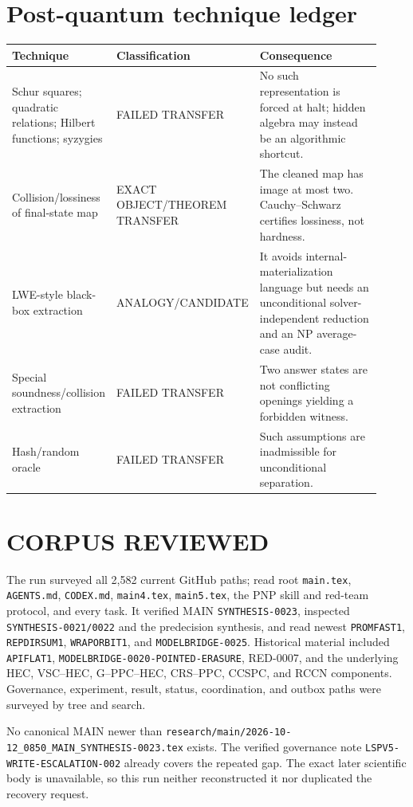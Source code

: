 \documentclass[11pt]{article}
\begin{document}
\section{Post-quantum technique ledger}
\begin{center}\small
\begin{tabular}{p{0.28\linewidth}p{0.20\linewidth}p{0.44\linewidth}}
\toprule
Technique & Classification & Consequence \\ \midrule
Schur squares; quadratic relations; Hilbert functions; syzygies
& FAILED TRANSFER & No such representation is forced at halt; hidden algebra
may instead be an algorithmic shortcut.\\
Collision/lossiness of final-state map
& EXACT OBJECT/THEOREM TRANSFER & The cleaned map has image at most two.
Cauchy--Schwarz certifies lossiness, not hardness.\\
LWE-style black-box extraction
& ANALOGY/CANDIDATE & It avoids internal-materialization language but needs
an unconditional solver-independent reduction and an NP average-case audit.\\
Special soundness/collision extraction
& FAILED TRANSFER & Two answer states are not conflicting openings yielding
a forbidden witness.\\
Hash/random oracle
& FAILED TRANSFER & Such assumptions are inadmissible for unconditional
separation.\\
\bottomrule
\end{tabular}
\end{center}

\section{CORPUS REVIEWED}
The run surveyed all 2,582 current GitHub paths; read root
\texttt{main.tex}, \texttt{AGENTS.md}, \texttt{CODEX.md},
\texttt{main4.tex}, \texttt{main5.tex}, the PNP skill and red-team protocol,
and every task. It verified MAIN \texttt{SYNTHESIS-0023}, inspected
\texttt{SYNTHESIS-0021/0022} and the predecision synthesis, and read newest
\texttt{PROMFAST1}, \texttt{REPDIRSUM1}, \texttt{WRAPORBIT1}, and
\texttt{MODELBRIDGE-0025}. Historical material included
\texttt{APIFLAT1}, \texttt{MODELBRIDGE-0020-POINTED-ERASURE}, RED-0007,
and the underlying HEC, VSC--HEC, G--PPC--HEC, CRS--PPC, CCSPC, and RCCN
components. Governance, experiment, result, status, coordination, and outbox
paths were surveyed by tree and search.

No canonical MAIN newer than
\texttt{research/main/2026-10-12\_0850\_MAIN\_SYNTHESIS-0023.tex} exists.
The verified governance note \texttt{LSPV5-WRITE-ESCALATION-002} already
covers the repeated gap. The exact later scientific body is unavailable, so
this run neither reconstructed it nor duplicated the recovery request.
\end{document}
